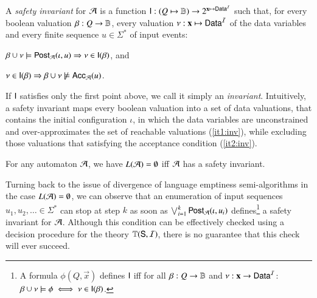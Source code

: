 \documentclass{llncs}
\begin{document}
A \emph{safety invariant} for $\mathcal{A}$ is a function $\mathsf{I} : (Q \mapsto
\mathbb{B}) \rightarrow 2^{\mathbf x \mapsto \mathsf{Data}^{\mathcal{I}}}$ such that, for every
boolean valuation $\beta : Q \rightarrow \mathbb{B}$, every valuation
$\nu : \mathbf x \mapsto \mathsf{Data}^{\mathcal{I}}$ of the data
variables and every finite sequence $u \in \Sigma^*$ of input events: \begin{compactenum}
%
\item\label{it1:inv} $\beta \cup \nu \models \mathsf{Post}_{\mathcal{A}}(\iota,u)
  \Rightarrow \nu \in \mathsf{I}(\beta)$, and
%
\item\label{it2:inv} $\nu \in \mathsf{I}(\beta) \Rightarrow \beta \cup \nu
  \not\models \mathsf{Acc}_{\mathcal{A}}(u)$.
\end{compactenum}
If $\mathsf{I}$ satisfies only the first point above, we call it simply an
\emph{invariant}. Intuitively, a safety invariant maps every boolean
valuation into a set of data valuations, that contains the initial
configuration $\iota$, in which the data variables are unconstrained
and over-approximates the set of reachable valuations (\ref{it1:inv}),
while excluding those valuations that satisfying the acceptance
condition (\ref{it2:inv}).

\begin{lemma}\label{lemma:safety-invariant}
  For any automaton $\mathcal{A}$, we have $L(\mathcal{A})
= \emptyset$ iff $\mathcal{A}$ has a safety invariant. 
\end{lemma}

Turning back to the issue of divergence of language emptiness
semi-algorithms in the case $L(\mathcal{A}) = \emptyset$, we can observe that
an enumeration of input sequences $u_1,u_2,\ldots \in \Sigma^*$ can
stop at step $k$ as soon as $\bigvee_{i=1}^k \mathsf{Post}_{\mathcal{A}}(\iota,u_i)$
defines\footnote{ A formula $\phi(Q,\vec{x})$ defines $\mathsf{I}$ iff for
  all $\beta: Q \rightarrow \mathbb{B}$ and $\nu : \mathbf x \rightarrow
  \mathsf{Data}^{\mathcal{I}}$: $\beta\cup\nu \models \phi \iff \nu \in \mathsf{I}(\beta)$. } a
safety invariant for $\mathcal{A}$. Although this condition can be effectively
checked using a decision procedure for the theory $\mathbb{T}(\mathsf{S},\mathcal{I})$,
there is no guarantee that this check will ever succeed.
\end{document}
